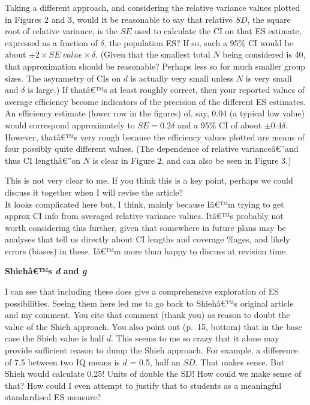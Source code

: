 \begin{appendix}
\color{black} Taking a different approach, and considering the relative
variance values plotted in Figures 2 and 3, would it be reasonable to
say that relative \(SD\), the square root of relative variance, is the
\(SE\) used to calculate the CI on that ES estimate, expressed as a
fraction of \(\delta\), the population ES? If so, such a 95\(\%\) CI
would be about \(\pm 2 \times SE \; value \times \delta\). (Given that
the smallest total \(N\) being considered is 40, that approximation
should be reasonable? Perhaps less so for much smaller group sizes. The
asymmetry of CIs on \(d\) is actually very small unless \(N\) is very
small and \(\delta\) is large.) If thatâ€™s at least roughly correct,
then your reported values of average efficiency become indicators of the
precision of the different ES estimates. An efficiency estimate (lower
row in the figures) of, say, 0.04 (a typical low value) would correspond
approximately to \(SE=0.2\delta\) and a 95\(\%\) CI of about
\(\pm 0.4 \delta\). However, thatâ€™s very rough because the efficiency
values plotted are means of four possibly quite different values. (The
dependence of relative varianceâ€''and thus CI lengthâ€''on \(N\) is
clear in Figure 2, and can also be seen in Figure 3.)

\color{blue} This is not very clear to me. If you think this is a key
point, perhaps we could discuss it together when I will revise the
article?\\
\color{brown} It looks complicated here but, I think, mainly because
Iâ€™m trying to get approx CI info from averaged relative variance
values. Itâ€™s probably not worth considering this further, given that
somewhere in future plans may be analyses that tell us directly about CI
lengths and coverage \%ages, and likely errors (biases) in these. Iâ€™m
more than happy to discuss at revision time.

\color{black} \textbf{Shiehâ€™s \emph{d} and \emph{g}}

I can see that including these does give a comprehensive exploration of
ES possibilities. Seeing them here led me to go back to Shiehâ€™s
original article and my comment. You cite that comment (thank you) as
reason to doubt the value of the Shieh approach. You also point out
(p.~15, bottom) that in the base case the Shieh value is half \(d\).
This seems to me so crazy that it alone may provide sufficient reason to
dump the Shieh approach. For example, a difference of 7.5 between two IQ
means is \(d\) = 0.5, half an \(SD\). That makes sense. But Shieh would
calculate 0.25! Units of double the SD! How could we make sense of that?
How could I even attempt to justify that to students as a meaningful
standardised ES measure?


\end{appendix}

